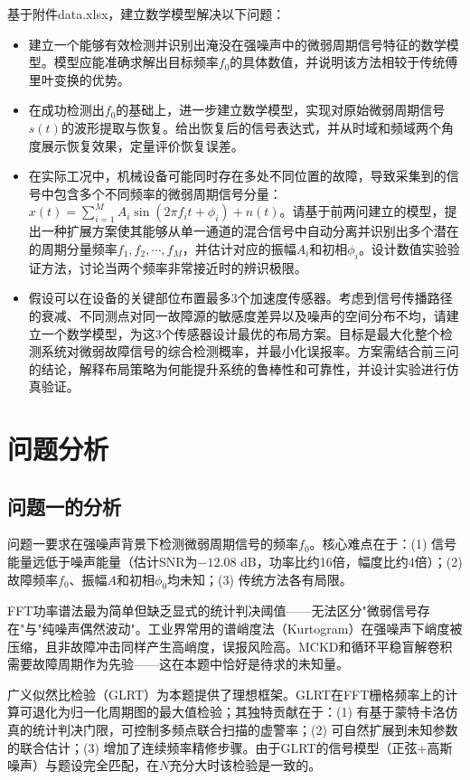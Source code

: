 \documentclass[withoutpreface,bwprint]{cumcmthesis}
\begin{document}
基于附件data.xlsx，建立数学模型解决以下问题：
\begin{itemize}
    \item [问题一] 建立一个能够有效检测并识别出淹没在强噪声中的微弱周期信号特征的数学模型。模型应能准确求解出目标频率$f_{0}$的具体数值，并说明该方法相较于传统傅里叶变换的优势。
    \item [问题二] 在成功检测出$f_{0}$的基础上，进一步建立数学模型，实现对原始微弱周期信号$s(t)$的波形提取与恢复。给出恢复后的信号表达式，并从时域和频域两个角度展示恢复效果，定量评价恢复误差。
    \item [问题三] 在实际工况中，机械设备可能同时存在多处不同位置的故障，导致采集到的信号中包含多个不同频率的微弱周期信号分量：$x(t) = \sum_{i=1}^{M} A_i \sin(2\pi f_i t + \phi_i) + n(t)$。请基于前两问建立的模型，提出一种扩展方案使其能够从单一通道的混合信号中自动分离并识别出多个潜在的周期分量频率$f_1, f_2, \cdots, f_M$，并估计对应的振幅$A_i$和初相$\phi_i$。设计数值实验验证方法，讨论当两个频率非常接近时的辨识极限。
    \item [问题四] 假设可以在设备的关键部位布置最多3个加速度传感器。考虑到信号传播路径的衰减、不同测点对同一故障源的敏感度差异以及噪声的空间分布不均，请建立一个数学模型，为这3个传感器设计最优的布局方案。目标是最大化整个检测系统对微弱故障信号的综合检测概率，并最小化误报率。方案需结合前三问的结论，解释布局策略为何能提升系统的鲁棒性和可靠性，并设计实验进行仿真验证。
\end{itemize}

\section{问题分析}
\subsection{问题一的分析}
问题一要求在强噪声背景下检测微弱周期信号的频率$f_0$。核心难点在于：(1) 信号能量远低于噪声能量（估计SNR为$-12.08$ dB，功率比约16倍，幅度比约4倍）；(2) 故障频率$f_0$、振幅$A$和初相$\phi_0$均未知；(3) 传统方法各有局限。

FFT功率谱法最为简单但缺乏显式的统计判决阈值——无法区分"微弱信号存在"与"纯噪声偶然波动"。工业界常用的谱峭度法（Kurtogram）在强噪声下峭度被压缩，且非故障冲击同样产生高峭度，误报风险高。MCKD和循环平稳盲解卷积需要故障周期作为先验——这在本题中恰好是待求的未知量。

广义似然比检验（GLRT）为本题提供了理想框架。GLRT在FFT栅格频率上的计算可退化为归一化周期图的最大值检验；其独特贡献在于：(1) 有基于蒙特卡洛仿真的统计判决门限，可控制多频点联合扫描的虚警率；(2) 可自然扩展到未知参数的联合估计；(3) 增加了连续频率精修步骤。由于GLRT的信号模型（正弦+高斯噪声）与题设完全匹配，在$N$充分大时该检验是一致的。
\end{document}
